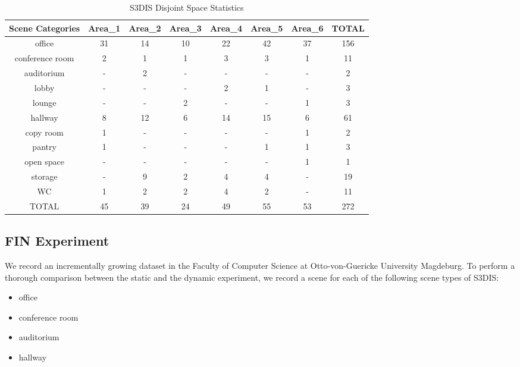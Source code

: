 \documentclass[main.tex]{subfiles}
\begin{document}
\begin{table}[H]
    \centering
    \begin{tabular}{c|c|c|c|c|c|c|c}
        \hline
        Scene Categories & Area\_1 & Area\_2 & Area\_3 & Area\_4 & Area\_5 & Area\_6 & TOTAL \\ \hline
        office           & 31      & 14      & 10      & 22      & 42      & 37      & 156   \\ \hline
        conference room  & 2       & 1       & 1       & 3       & 3       & 1       & 11    \\ \hline
        auditorium       & -       & 2       & -       & -       & -       & -       & 2     \\ \hline
        lobby            & -       & -       & -       & 2       & 1       & -       & 3     \\ \hline
        lounge           & -       & -       & 2       & -       & -       & 1       & 3     \\ \hline
        hallway          & 8       & 12      & 6       & 14      & 15      & 6       & 61    \\ \hline
        copy room        & 1       & -       & -       & -       & -       & 1       & 2     \\ \hline
        pantry           & 1       & -       & -       & -       & 1       & 1       & 3     \\ \hline
        open space       & -       & -       & -       & -       & -       & 1       & 1     \\ \hline
        storage          & -       & 9       & 2       & 4       & 4       & -       & 19    \\ \hline
        WC               & 1       & 2       & 2       & 4       & 2       & -       & 11    \\ \hline
        TOTAL            & 45      & 39      & 24      & 49      & 55      & 53      & 272   \\
    \end{tabular}
    \caption{S3DIS Disjoint Space Statistics}
    \label{tab:stanfordStats}
\end{table}

\subsection{FIN Experiment}
We record an incrementally growing dataset in the Faculty of Computer Science at Otto-von-Guericke University Magdeburg.
To perform a thorough comparison between the static and the dynamic experiment, we record a scene for each of the following scene types of S3DIS:
\begin{itemize}
    \item office
    \item conference room
    \item auditorium
    \item hallway
\end{itemize}
\end{document}
